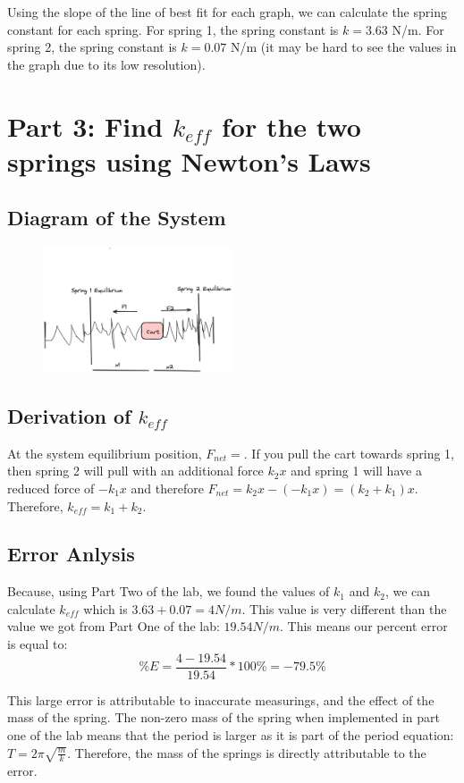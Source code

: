 \documentclass{report}
\begin{document}
Using the slope of the line of best fit for each graph, we can calculate the spring constant for each spring. For spring 1, the spring constant is $k = 3.63$ N/m. For spring 2, the spring constant is $k = 0.07$ N/m (it may be hard to see the values in the graph due to its low resolution).

\section*{Part 3: Find $k_{eff}$ for the two springs using Newton's Laws}

\subsection*{Diagram of the System}

\begin{figure}[h!]
  \begin{center}
    \includegraphics[width=0.5\textwidth]{figures/diagram.png}
  \end{center}
\end{figure}

\subsection*{Derivation of $k_{eff}$}

At the system equilibrium position, $F_{net} = $. If you pull the cart towards spring 1, then spring 2 will pull with an additional force $k_2 x$ and spring 1 will have a reduced force of $ -k_1 x$ and therefore $ F_{net} = k_2 x - (-k_1 x) = (k_2 + k_1)x $. Therefore, $k_{eff} = k_1 + k_2 $.

\subsection*{Error Anlysis}

Because, using Part Two of the lab, we found the values of $ k_1 $ and $ k_2 $, we can calculate $ k_{eff} $ which is $ 3.63 + 0.07 = 4 N/m$. This value is very different than the value we got from Part One of the lab: $ 19.54 N/m $. This means our percent error is equal to: $$ \%E = \frac{4-19.54}{19.54} * 100\% = -79.5 \%$$

This large error is attributable to inaccurate measurings, and the effect of the mass of the spring. The non-zero mass of the spring when implemented in part one of the lab means that the period is larger as it is part of the period equation: $ T = 2 \pi \sqrt{\frac{m}{k}} $. Therefore, the mass of the springs is directly attributable to the error. 
\end{document}
